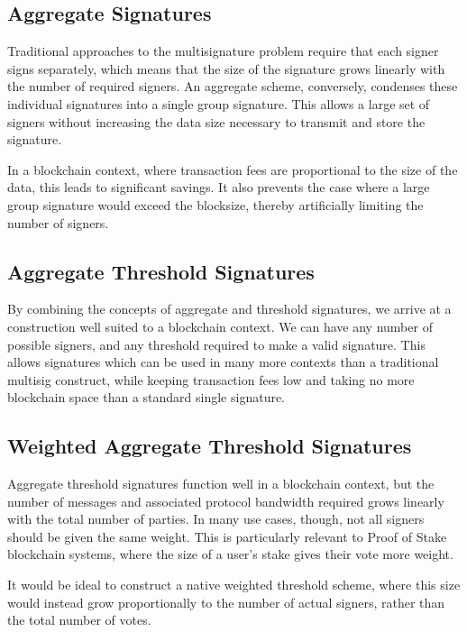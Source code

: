 \documentclass{article}
\begin{document}
\subsection{
  Aggregate Signatures
}

Traditional approaches to the multisignature problem require that each signer signs separately, which means that the size of the signature grows linearly with the number of required signers.  An aggregate scheme, conversely, condenses these individual signatures into a single group signature.  This allows a large set of signers without increasing the data size necessary to transmit and store the signature.

In a blockchain context, where transaction fees are proportional to the size of the data, this leads to significant savings.  It also prevents the case where a large group signature would exceed the blocksize, thereby artificially limiting the number of signers.

\subsection{
  Aggregate Threshold Signatures
}

By combining the concepts of aggregate and threshold signatures, we arrive at a construction well suited to a blockchain context.  We can have any number of possible signers, and any threshold required to make a valid signature.  This allows signatures which can be used in many more contexts than a traditional multisig construct, while keeping transaction fees low and taking no more blockchain space than a standard single signature.

\subsection{
  Weighted Aggregate Threshold Signatures
}

Aggregate threshold signatures function well in a blockchain context, but the number of messages and associated protocol bandwidth required grows linearly with the total number of parties.  In many use cases, though, not all signers should be given the same weight.  This is particularly relevant to Proof of Stake blockchain systems, where the size of a user's stake gives their vote more weight.

It would be ideal to construct a native weighted threshold scheme, where this size would instead grow proportionally to the number of actual signers, rather than the total number of votes.  
\end{document}
